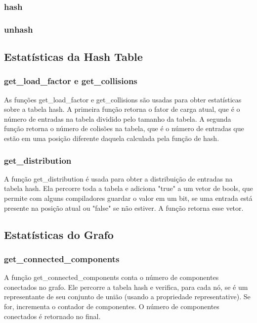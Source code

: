 \documentclass[a4paper,11pt]{article}
\begin{document}
    \subsubsection{hash}
    
    \subsubsection{unhash}


    \subsection{Estatísticas da Hash Table}\label{subsec:estatisticas-da-hash-table}

    \subsubsection{get\_load\_factor e get\_collisions}
   As funções get\_load\_factor e get\_collisions são usadas para obter estatísticas sobre a tabela hash. A primeira função retorna o fator de carga atual, que é o número de entradas na tabela dividido pelo tamanho da tabela. A segunda função retorna o número de colisões na tabela, que é o número de entradas que estão em uma posição diferente daquela calculada pela função de hash.
    
    \subsubsection{get\_distribution}
    A função get\_distribution é usada para obter a distribuição de entradas na tabela hash. Ela percorre toda a tabela e adiciona "true" a um vetor de bools, que permite com alguns compiladores guardar o valor em um bit, se uma entrada está presente na posição atual ou "false" se não estiver. A função retorna esse vetor.
    
    \subsection{Estatísticas do Grafo}\label{subsec:estatisticas-do-grafo}
    
    \subsubsection{get\_connected\_components}
    A função get\_connected\_components conta o número de componentes conectados no grafo. Ele percorre a tabela hash e verifica, para cada nó, se é um representante de seu conjunto de união (usando a propriedade representative). Se for, incrementa o contador de componentes. O número de componentes conectados é retornado no final.
    
\end{document}
